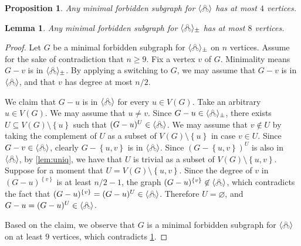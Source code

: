 \documentclass[10pt,a4paper]{amsart}
\newtheorem{proposition}{Proposition}
\newtheorem{lemma}{Lemma}
\newcommand{\cherry}{\tikz[baseline=-0.15ex]{\draw[darkgray, thick] (0,0)--(0.1,0.17320508075)--(0.2,0); \draw[darkgray, fill=white] (0,0) circle (0.05); \draw[darkgray, fill=white] (0.1,0.17320508075) circle (0.05); \draw[darkgray, fill=white] (0.2,0) circle (0.05);}}
\newcommand{\cl}[1]{\langle #1 \rangle}
\newcommand{\gen}[1]{\langle #1 \rangle_\pm}
\newcommand{\sset}[1]{\left\{{#1}\right\}}
\begin{document}
\begin{proposition} \label{lem:min-forb}
    Any minimal forbidden subgraph for $\cl\cherry$ has at most $4$ vertices.
\end{proposition}

\begin{lemma} \label{lem:min-forb-switching}
    Any minimal forbidden subgraph for $\gen\cherry$ has at most $8$ vertices.
\end{lemma}

\begin{proof}
    Let $G$ be a minimal forbidden subgraph for $\gen\cherry$ on $n$ vertices. Assume for the sake of contradiction that $n \ge 9$. Fix a vertex $v$ of $G$. Minimality means $G - v$ is in $\gen\cherry$. By applying a switching to $G$, we may assume that $G - v$ is in $\cl\cherry$, and that $v$ has degree at most $n/2$.
    
    We claim that $G - u$ is in $\cl\cherry$ for every $u \in V(G)$. Take an arbitrary $u \in V(G)$. We may assume that $u \neq v$. Since $G - u \in \gen\cherry$, there exists $U \subseteq V(G)\setminus \sset{u}$ such that $(G-u)^U \in \cl\cherry$. We may assume that $v \not\in U$ by taking the complement of $U$ as a subset of $V(G) \setminus \sset{u}$ in case $v \in U$. Since $G - v \in \cl\cherry$, clearly $G - \sset{u,v}$ is in $\cl\cherry$. Since $(G - \sset{u,v})^{U}$ is also in $\cl\cherry$, by \cref{lem:uniq}, we have that $U$ is trivial as a subset of $V(G) \setminus \sset{u,v}$. Suppose for a moment that $U = V(G) \setminus \sset{u,v}$. Since the degree of $v$ in $(G - u)^{\sset{v}}$ is at least $n / 2 - 1$, the graph $(G - u)^{\sset{v}} \not\in \cl\cherry$, which contradicts the fact that $(G - u)^{\sset{v}} = (G - u)^U \in \cl\cherry$. Therefore $U = \varnothing$, and $G - u = (G - u)^U \in \cl\cherry$.
    
    Based on the claim, we observe that $G$ is a minimal forbidden subgraph for $\cl\cherry$ on at least $9$ vertices, which contradicts \cref{lem:min-forb}.
\end{proof}
\end{document}
